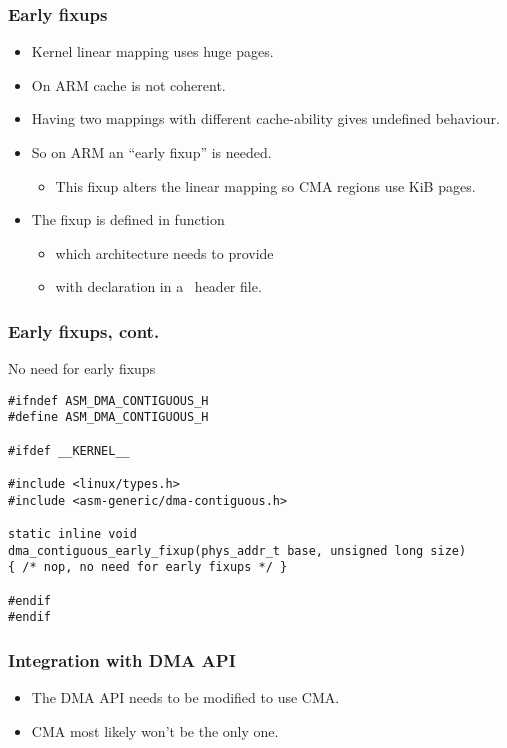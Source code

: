 \begin{frame}
  \frametitle{Early fixups}

  \begin{itemize}
  \item Kernel linear mapping uses huge pages.
  \item On ARM cache is not coherent.
  \item Having two mappings with different cache-ability gives
    undefined behaviour.
  \item So on ARM an “early fixup” is needed.
    \begin{itemize}
    \item This fixup alters the linear mapping so CMA regions use
      \unit[4]{KiB} pages.
    \end{itemize}
  \item The fixup is defined in
     function
    \begin{itemize}
    \item which architecture needs to provide
    \item with declaration in a~ header file.
    \end{itemize}
  \end{itemize}
\end{frame}

\begin{frame}[fragile]
  \frametitle{Early fixups, cont.}

  \begin{block}{No need for early fixups}
\begin{lstlisting}
#ifndef ASM_DMA_CONTIGUOUS_H
#define ASM_DMA_CONTIGUOUS_H

#ifdef __KERNEL__

#include <linux/types.h>
#include <asm-generic/dma-contiguous.h>

static inline void
dma_contiguous_early_fixup(phys_addr_t base, unsigned long size)
{ /* nop, no need for early fixups */ }

#endif
#endif
\end{lstlisting}
  \end{block}
\end{frame}

\begin{frame}
  \frametitle{Integration with DMA API}

  \begin{itemize}
  \item The DMA API needs to be modified to use CMA.
  \item CMA most likely won't be the only one.
  \end{itemize}
\end{frame}

